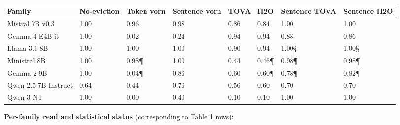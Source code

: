 \documentclass[10pt]{article}
\newcounter{none} %
\begin{document}
{\def\LTcaptype{none} %
{\scriptsize\setlength{\tabcolsep}{2pt}\renewcommand{\arraystretch}{0.92} \begin{longtable}[]{@{}llllllll@{}}
\toprule\noalign{}
Family & No-eviction & Token vorn & Sentence vorn & TOVA &
H2O & Sentence TOVA & Sentence H2O \\
\midrule\noalign{}
\endhead
\bottomrule\noalign{}
\endlastfoot
Mistral 7B v0.3 & 1.00\textdagger{} & 0.96\textdagger{} & 0.98\textdagger{} & 0.86\textdagger{} & 0.84\textdagger{} & 1.00\textdagger{} &
1.00\textdagger{} \\
Gemma 4 E4B-it & 1.00 & 0.02 & 0.24 & 0.94 & 0.94 & 0.88\textdaggerdbl{} & 0.86\textdaggerdbl{} \\
Llama 3.1 8B & 1.00 & 1.00 & 1.00 & 0.90 & 0.94 & 1.00\S{} & 1.00\S{} \\
Ministral 8B & 1.00 & 0.98\P{} & 1.00 & 0.44 & 0.46\P{} & 0.98\P{} & 0.98\P{} \\
Gemma 2 9B & 1.00 & 0.04\P{} & 0.86 & 0.60 & 0.60\P{} & 0.78\P{} & 0.82\P{} \\
Qwen 2.5 7B Instruct\textbar{}\textbar{} & 0.64 & 0.44 & 0.76 & 0.56 & 0.60 & 0.70 & 0.70 \\
Qwen 3-NT\textbar{}\textbar{} & 1.00 & 0.00 & 0.40 & 0.10 & 0.10 & 1.00\textdagger{}\textdagger{} & 1.00\textdagger{}\textdagger{} \\
\end{longtable}}
}

\textbf{Per-family read and statistical status} (corresponding to Table
1 rows):
\end{document}
